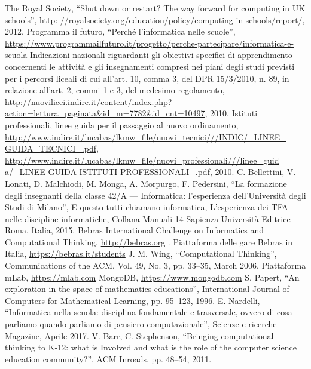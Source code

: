 \documentclass[12pt]{report}
\begin{document}
\begin{thebibliography}{00}
%
The Royal Society, ``Shut down or restart? The way forward for computing in UK schools'', \url{http: //royalsociety.org/education/policy/computing-in-schools/report/}, 2012.
%
Programma il futuro, ``Perché l'informatica nelle scuole'',
\url{https://www.programmailfuturo.it/progetto/perche-partecipare/informatica-e-scuola}
%
Indicazioni nazionali riguardanti gli obiettivi specifici di apprendimento concernenti le attività e gli insegnamenti compresi nei piani degli studi previsti per i percorsi liceali di cui all'art. 10, comma 3, del DPR 15/3/2010, n. 89, in relazione all'art. 2, commi 1 e 3, del medesimo regolamento, \url{http://nuovilicei.indire.it/content/index.php?action=lettura_paginata&id_m=7782&id_cnt=10497}, 2010.
%
Istituti professionali, linee guida per il passaggio al nuovo ordinamento, \url{http://www.indire.it/lucabas/lkmw_file/nuovi_tecnici///INDIC/_LINEE_ GUIDA_TECNICI_.pdf}, \url{http://www.indire.it/lucabas/lkmw_file/nuovi_professionali///linee_guid a/_LINEE GUIDA ISTITUTI PROFESSIONALI_.pdf}, 2010.
%
C. Bellettini, V. Lonati, D. Malchiodi, M. Monga, A. Morpurgo, F. Pedersini, ``La formazione degli insegnanti della classe 42/A --- Informatica: l'esperienza dell'Università degli Studi di Milano'', 
E questo tutti chiamano informatica, L'esperienza dei TFA nelle discipline informatiche, 
Collana Manuali 14 Sapienza Università Editrice Roma, Italia,
2015.
%
Bebras International Challenge on Informatics and Computational Thinking, \url{http://bebras.org} .
%
Piattaforma delle gare Bebras in Italia, \url{https://bebras.it/students}
%
J. M. Wing, ``Computational Thinking”, Communications of the ACM, 
Vol. 49, No. 3, pp. 33–35,
March 
2006.
%
Piattaforma mLab, \url{https://mlab.com}
%
MongoDB, \url{https://www.mongodb.com}
%
S. Papert, ``An exploration in the space of mathematics educations'',
International Journal of Computers for Mathematical Learning, 
pp. 95–123, 
1996.
%
E. Nardelli, ``Informatica nella scuola: disciplina fondamentale e trasversale, ovvero di cosa parliamo quando parliamo di pensiero computazionale'',
Scienze e ricerche Magazine,
Aprile 2017.
%
V. Barr, C. Stephenson, ``Bringing computational thinking to K-12: what is Involved and what is the role of the computer science education community?'', 
ACM Inroads, 
pp. 48–54,
2011.
%
\end{thebibliography}


% 
%

\end{document}
